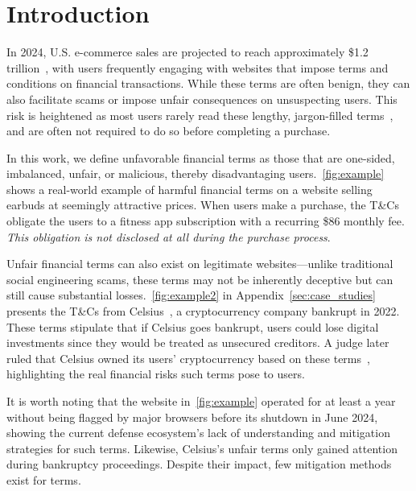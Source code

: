 \section{Introduction}



In 2024, U.S. e-commerce sales are projected to reach approximately \$1.2 trillion~\citep{digitalcommerce2023ecommerce}, with users frequently engaging with websites that impose terms and conditions on financial transactions. While these terms are often benign, they can also facilitate scams or impose unfair consequences on unsuspecting users. This risk is heightened as most users rarely read these lengthy, jargon-filled terms~\citep{obar2020biggest, steinfeld2016agree, bakos2014does}, and are often not required to do so before completing a purchase.


In this work, we define unfavorable financial terms as those that are one-sided, imbalanced, unfair, or malicious, thereby disadvantaging users.~\autoref{fig:example} shows a real-world example of harmful financial terms on a website selling earbuds at seemingly attractive prices. When users make a purchase, the T\&Cs obligate the users to a fitness app subscription with a recurring \$86 monthly fee. \textit{This obligation is not disclosed at all during the purchase process}. 

Unfair financial terms can also exist on legitimate websites---unlike traditional social engineering scams, these terms may not be inherently deceptive but can still cause substantial losses.~\autoref{fig:example2} in Appendix~\ref{sec:case_studies} presents the T\&Cs from Celsius~\citep{celsiuswebsite}, a cryptocurrency company bankrupt in 2022. These terms stipulate that if Celsius goes bankrupt, users could lose digital investments since they would be treated as unsecured creditors. A judge later ruled that Celsius owned its users' cryptocurrency based on these terms~\citep{celsius}, highlighting the real financial risks such terms pose to users. 

It is worth noting that the website in~\autoref{fig:example} operated for at least a year without being flagged by major browsers before its shutdown in June 2024, showing the current defense ecosystem's lack of understanding and mitigation strategies for such \termname terms. Likewise, Celsius's unfair terms only gained attention during bankruptcy proceedings. Despite their impact, few mitigation methods exist for \termname terms.

